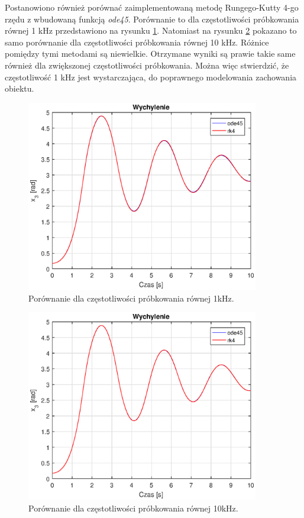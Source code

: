 Postanowiono również porównać zaimplementowaną metodę Rungego-Kutty 4-go rzędu z wbudowaną funkcją \textit{ode45}. Porównanie to dla częstotliwości próbkowania równej 1 kHz przedstawiono na rysunku \ref{fig:wychylenie_1khz}. Natomiast na rysunku \ref{fig:wychylenie_10khz} pokazano to samo porównanie dla częstotliwości próbkowania równej 10 kHz. Różnice pomiędzy tymi metodami są niewielkie. Otrzymane wyniki są prawie takie same również dla zwiększonej częstotliwości próbkowania. Można więc stwierdzić, że częstotliwość 1 kHz jest wystarczająca, do poprawnego modelowania zachowania obiektu.
\newpage
\begin{figure}[h]
	\centering
	\includegraphics[width=4in]{Figures/wychylenie_1khz.eps}
	\caption{Porównanie dla częstotliwości próbkowania równej 1kHz.}
	\label{fig:wychylenie_1khz}
\end{figure}

\begin{figure}[h]
	\centering
	\includegraphics[width=4in]{Figures/wychylenie_10khz.eps}
	\caption{Porównanie dla częstotliwości próbkowania równej 10kHz.}
	\label{fig:wychylenie_10khz}
\end{figure}